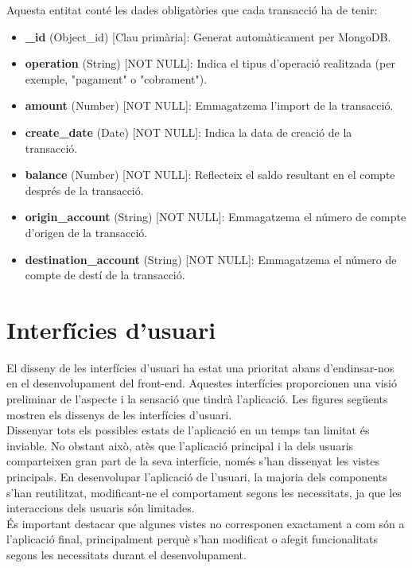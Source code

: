\documentclass[a4paper,12pt,twoside]{ThesisStyle}
\begin{document}
Aquesta entitat conté les dades obligatòries que cada transacció ha de tenir:

\begin{itemize}
    \item \textbf{\_id} (Object\_id) [Clau primària]: Generat automàticament per MongoDB.
    \item \textbf{operation} (String) [NOT NULL]: Indica el tipus d'operació realitzada (per exemple, "pagament" o "cobrament").
    \item \textbf{amount} (Number) [NOT NULL]: Emmagatzema l'import de la transacció.
    \item \textbf{create\_date} (Date) [NOT NULL]: Indica la data de creació de la transacció.
    \item \textbf{balance} (Number) [NOT NULL]: Reflecteix el saldo resultant en el compte després de la transacció.
    \item \textbf{origin\_account} (String) [NOT NULL]: Emmagatzema el número de compte d'origen de la transacció.
    \item \textbf{destination\_account} (String) [NOT NULL]: Emmagatzema el número de compte de destí de la transacció.
\end{itemize}


\section{ Interfícies d'usuari }
\label{ sec: Interfícies d'usuari }


El disseny de les interfícies d'usuari ha estat una prioritat abans d'endinsar-nos en el desenvolupament del front-end. Aquestes interfícies proporcionen una visió preliminar de l'aspecte i la sensació que tindrà l'aplicació. Les figures següents mostren els dissenys de les interfícies d'usuari. \\

Dissenyar tots els possibles estats de l'aplicació en un temps tan limitat és inviable. No obstant això, atès que l'aplicació principal i la dels usuaris comparteixen gran part de la seva interfície, només s'han dissenyat les vistes principals. En desenvolupar l'aplicació de l'usuari, la majoria dels components s'han reutilitzat, modificant-ne el comportament segons les necessitats, ja que les interaccions dels usuaris són limitades.\\

És important destacar que algunes vistes no corresponen exactament a com són a l'aplicació final, principalment perquè s'han modificat o afegit funcionalitats segons les necessitats durant el desenvolupament.\\
\end{document}
